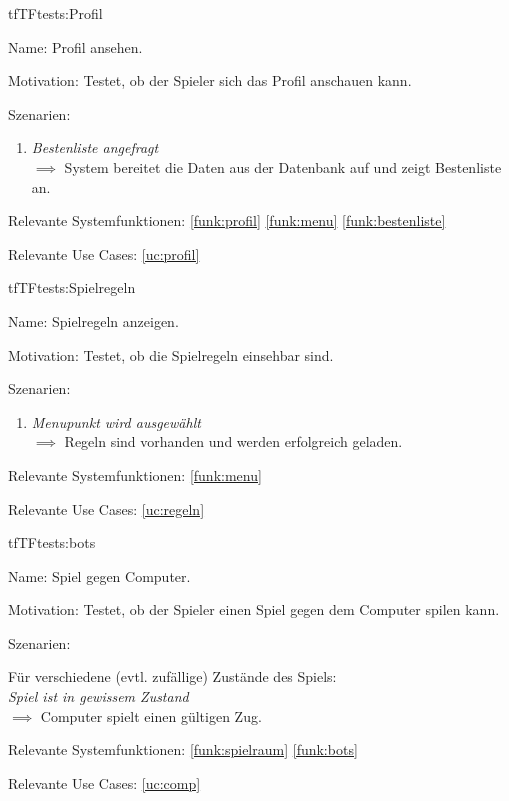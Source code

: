 \begin{description}[leftmargin=5em, style=sameline]
\begin{lhp}{tf}{TF}{tests:Profil}
	\item [Name:] Profil ansehen.
	\item [Motivation:] Testet, ob der Spieler sich das Profil anschauen kann.
	\item [Szenarien:] \hfill
		\begin{enumerate}
			\item \textit{Bestenliste angefragt} \\ $\implies$ System bereitet die Daten aus der Datenbank auf und zeigt Bestenliste an.
		\end{enumerate}
	\item [Relevante Systemfunktionen:] \ref{funk:profil} \ref{funk:menu} \ref{funk:bestenliste}
	\item [Relevante Use Cases:] \ref{uc:profil}	
\end{lhp}

\begin{lhp}{tf}{TF}{tests:Spielregeln}
	\item [Name:] Spielregeln anzeigen.
	\item [Motivation:] Testet, ob die Spielregeln einsehbar sind.
	\item [Szenarien:] \hfill
		\begin{enumerate}
			\item \textit{Menupunkt wird ausgewählt} \\ $\implies$ Regeln sind vorhanden und werden erfolgreich geladen.
		\end{enumerate}
	\item [Relevante Systemfunktionen:] \ref{funk:menu}
	\item [Relevante Use Cases:] \ref{uc:regeln}
		
\end{lhp}

\begin{lhp}{tf}{TF}{tests:bots}
	\item [Name:] Spiel gegen Computer.
	\item [Motivation:] Testet, ob der Spieler einen Spiel gegen dem Computer spilen kann.
	\item [Szenarien:] \hfill
		\item Für verschiedene (evtl. zufällige) Zustände des Spiels: \\
			\textit{Spiel ist in gewissem Zustand} \\ $\implies$ Computer spielt einen gültigen Zug.
	\item [Relevante Systemfunktionen:] \ref{funk:spielraum} \ref{funk:bots}
	\item [Relevante Use Cases:] \ref{uc:comp}
		

\end{lhp}
\end{description}
